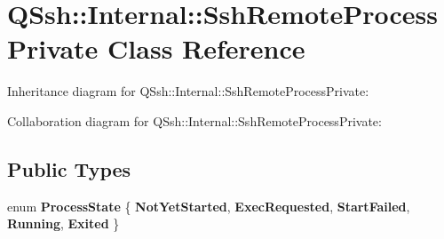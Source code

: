 \hypertarget{class_q_ssh_1_1_internal_1_1_ssh_remote_process_private}{}\section{Q\+Ssh\+:\+:Internal\+:\+:Ssh\+Remote\+Process\+Private Class Reference}
\label{class_q_ssh_1_1_internal_1_1_ssh_remote_process_private}


Inheritance diagram for Q\+Ssh\+:\+:Internal\+:\+:Ssh\+Remote\+Process\+Private\+:


Collaboration diagram for Q\+Ssh\+:\+:Internal\+:\+:Ssh\+Remote\+Process\+Private\+:
\subsection*{Public Types}
\begin{DoxyCompactItemize}
\item 
\mbox{\label{class_q_ssh_1_1_internal_1_1_ssh_remote_process_private_ab757b69b722223f0956e5221ff8607de}} 
enum {\bfseries Process\+State} \{ \newline
{\bfseries Not\+Yet\+Started}, 
{\bfseries Exec\+Requested}, 
{\bfseries Start\+Failed}, 
{\bfseries Running}, 
\newline
{\bfseries Exited}
 \}
\end{DoxyCompactItemize}
